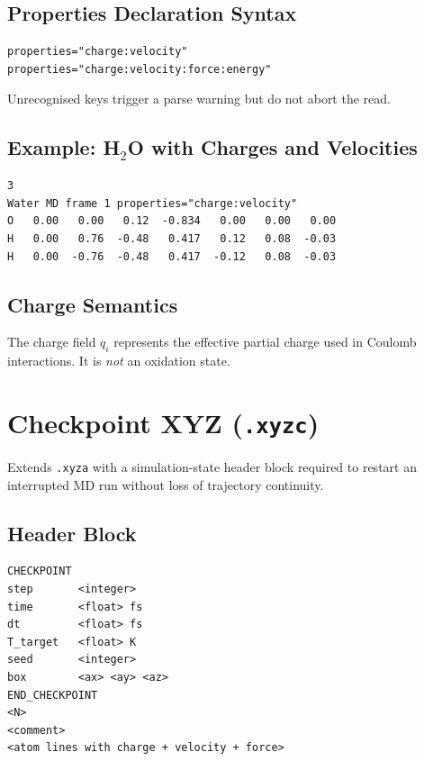 \documentclass[12pt, a4paper, oneside]{article}
\begin{document}
\subsection{Properties Declaration Syntax}

\begin{lstlisting}[language={},frame=single]
properties="charge:velocity"
properties="charge:velocity:force:energy"
\end{lstlisting}

Unrecognised keys trigger a parse warning but do not abort the read.

\subsection{Example: H\texorpdfstring{$_2$}{2}O with Charges and Velocities}

\begin{lstlisting}[language={},frame=single]
3
Water MD frame 1 properties="charge:velocity"
O   0.00   0.00   0.12  -0.834   0.00   0.00   0.00
H   0.00   0.76  -0.48   0.417   0.12   0.08  -0.03
H   0.00  -0.76  -0.48   0.417  -0.12   0.08  -0.03
\end{lstlisting}

\subsection{Charge Semantics}

The charge field $q_i$ represents the effective partial charge used in
Coulomb interactions.  It is \emph{not} an oxidation state.

\section{Checkpoint XYZ (\texttt{.xyzc})}
\label{sec:xyzc}

Extends \texttt{.xyza} with a simulation-state header block required
to restart an interrupted MD run without loss of trajectory continuity.

\subsection{Header Block}

\begin{lstlisting}[language={},frame=single]
CHECKPOINT
step       <integer>
time       <float> fs
dt         <float> fs
T_target   <float> K
seed       <integer>
box        <ax> <ay> <az>
END_CHECKPOINT
<N>
<comment>
<atom lines with charge + velocity + force>
\end{lstlisting}
\end{document}
